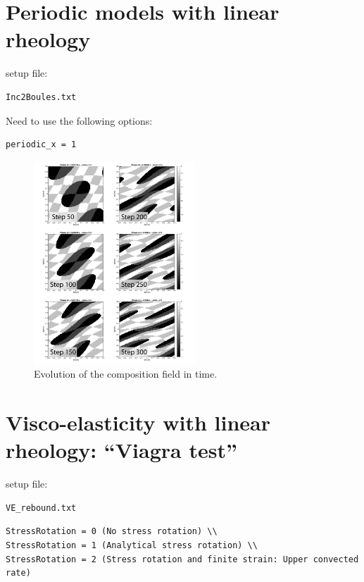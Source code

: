\documentclass[12pt,english,openany]{scrbook}
\begin{document}
\section{Periodic models with linear rheology}

setup file:
\begin{verbatim} 
Inc2Boules.txt
\end{verbatim}

Need to use the following options:
\begin{verbatim} 
periodic_x = 1
\end{verbatim}

\begin{figure}[ht!]
\centerline{\includegraphics[height=3.0in]{./Figures/Periodic_Inc2Boules_MDOODZ}}
\caption{Evolution of the composition field in time.}
\label{Inc2Bouless}
\end{figure}

\section{Visco-elasticity with linear rheology: ``Viagra test'' }

setup file:
\begin{verbatim} 
VE_rebound.txt
\end{verbatim}

\begin{verbatim} 
StressRotation = 0 (No stress rotation) \\
StressRotation = 1 (Analytical stress rotation) \\
StressRotation = 2 (Stress rotation and finite strain: Upper convected rate)
\end{verbatim}
\end{document}
